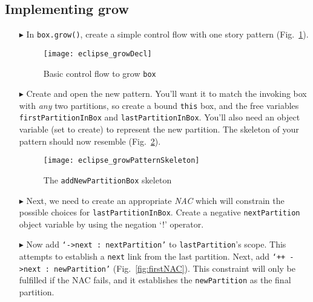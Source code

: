 \clearpage
\hypertarget{growBox tex}{}
\subsection{Implementing grow}
\texHeader

\vspace*{0.5cm}

\begin{itemize}

\item[$\blacktriangleright$] In \texttt{box.grow()}, create a simple control flow with one story pattern (Fig.~\ref{fig:growDecl}). 

\begin{figure}[htbp]
\begin{center}
  \texttt{[image: eclipse\_growDecl]}
  \caption{Basic control flow to grow \texttt{box}}
  \label{fig:growDecl}
\end{center}
\end{figure}

\item[$\blacktriangleright$] Create and open the new pattern. You'll want it to match the invoking box with \emph{any} two partitions, so create a bound
\texttt{this} box, and the free variables \texttt{firstPartitionInBox} and \texttt{lastPartitionInBox}. You'll also need an object variable (set to create) to
represent the new partition. The skeleton of your pattern should now resemble (Fig.~\ref{fig:growPattSkel}).

\vspace{0.5cm}

\begin{figure}[htbp]
\begin{center}
  \texttt{[image: eclipse\_growPatternSkeleton]}
  \caption{The \texttt{addNewPartitionBox} skeleton}
  \label{fig:growPattSkel}
\end{center}
\end{figure}

\item[$\blacktriangleright$] Next, we need to create an appropriate \emph{NAC} which will constrain the possible choices for \texttt{lastPartitionInBox}.
Create a negative \texttt{next\-Part\-it\-ion} object variable by using the negation `!' operator.

\vspace{0.5cm}

\item[$\blacktriangleright$] Now add \texttt{`->next : nextPartition'} to \texttt{lastPartition}'s scope. This attempts to establish a \texttt{next} link from
the last partition. Next, add \texttt{`++ ->next : newPartition'} (Fig.~\ref{fig:firstNAC}). This constraint will only be fulfilled if the NAC fails, and it
establishes the \texttt{newPartition} as the final partition.


\end{itemize}
